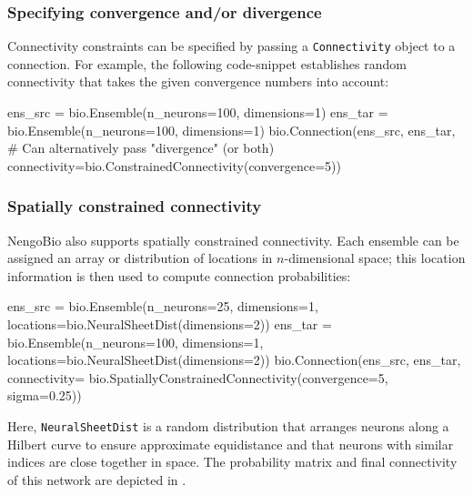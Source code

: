 \subsubsection{Specifying convergence and/or divergence}
Connectivity constraints can be specified by passing a \texttt{Connectivity} object to a connection.
For example, the following code-snippet establishes random connectivity that takes the given convergence numbers into account:
\begin{pythoncode}
ens_src = bio.Ensemble(n_neurons=100, dimensions=1)
ens_tar = bio.Ensemble(n_neurons=100, dimensions=1)
bio.Connection(ens_src, ens_tar, # Can alternatively pass "divergence" (or both)
               connectivity=bio.ConstrainedConnectivity(convergence=5))
\end{pythoncode}

\subsubsection{Spatially constrained connectivity}
NengoBio also supports spatially constrained connectivity.
Each ensemble can be assigned an array or distribution of locations in $n$-dimensional space; this location information is then used to compute connection probabilities:
\begin{pythoncode}
ens_src = bio.Ensemble(n_neurons=25, dimensions=1,
                       locations=bio.NeuralSheetDist(dimensions=2))
ens_tar = bio.Ensemble(n_neurons=100, dimensions=1,
                       locations=bio.NeuralSheetDist(dimensions=2))
bio.Connection(ens_src, ens_tar, connectivity=
               bio.SpatiallyConstrainedConnectivity(convergence=5, sigma=0.25))
\end{pythoncode}
Here, \texttt{NeuralSheetDist} is a random distribution that arranges neurons along a Hilbert curve to ensure approximate equidistance and that neurons with similar indices are close together in space.
The probability matrix and final connectivity of this network are depicted in .

